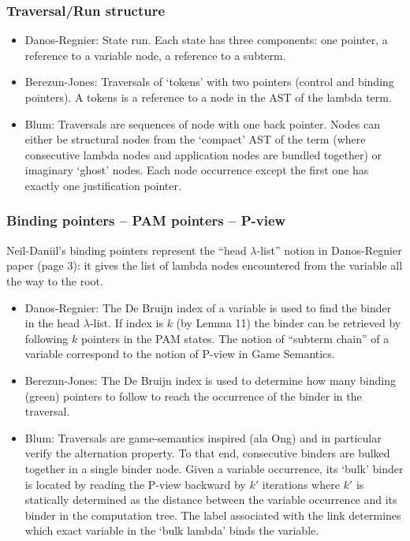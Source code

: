 \documentclass{article}
\theoremstyle{definition}
\begin{document}
\subsubsection{Traversal/Run structure}
\begin{itemize}
\item Danos-Regnier: State run. Each state has three components: one pointer, a reference to a variable node, a reference to a subterm.
\item Berezun-Jones: Traversals of `tokens' with two pointers (control and binding pointers). A tokens is a reference to a node in the AST of the lambda term.
\item Blum: Traversals are sequences of node with one back pointer. Nodes can either be structural nodes from the `compact' AST of the term (where consecutive lambda nodes and application nodes are bundled together) or imaginary `ghost' nodes. Each node occurrence except the first one has exactly one justification pointer.
\end{itemize}

\subsubsection{Binding pointers -- PAM pointers -- P-view}

Neil-Daniil's binding pointers represent the ``head $\lambda$-list'' notion in Danos-Regnier paper (page 3): it gives the list of lambda nodes encountered from the variable all the way to the root.

\begin{itemize}
\item Danos-Regnier: The De Bruijn index of a variable is used to find the binder in the head $\lambda$-list. If index is $k$ (by Lemma 11) the binder can be retrieved by following $k$ pointers in the PAM states. The notion of ``subterm chain'' of a variable correspond to the notion of P-view in Game Semantics.

\item  Berezun-Jones: The De Bruijn index is used to determine how many binding (green) pointers to follow to reach the occurrence of the binder in the traversal.

\item Blum: Traversals are game-semantics inspired (ala Ong) and in particular verify the alternation property. To that end, consecutive binders are bulked together in a single binder node. Given a variable occurrence, its `bulk' binder is located by reading the P-view backward by $k'$ iterations where $k'$ is statically determined as the distance between the variable occurrence and its binder in the computation tree. The label associated with the link determines which exact variable in the `bulk lambda' binds the variable.
\end{itemize}
\end{document}
